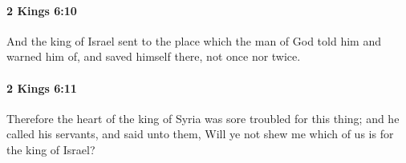 		\paragraph{2 Kings 6:10} %
			\label{2KINGS-6-10}

			And the king of Israel sent to the place which the man of God told him and warned him of, and saved himself there, not once nor twice.


		\paragraph{2 Kings 6:11} %
			\label{2KINGS-6-11}

			Therefore the heart of the king of Syria was sore troubled for this thing; and he called his servants, and said unto them, Will ye not shew me which of us is for the king of Israel?


